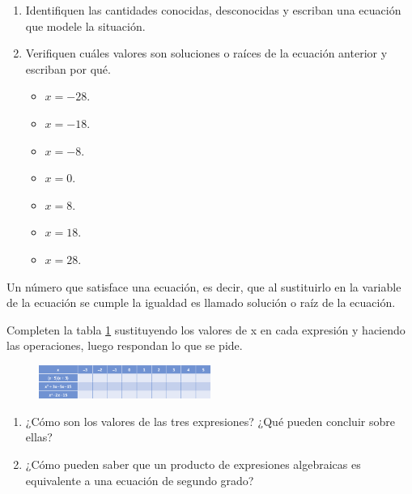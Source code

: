 \documentclass[11pt]{book}
\begin{document}
\begin{enumerate}
        \begin{enumerate}
          \item Identifiquen las cantidades conocidas, desconocidas y escriban una ecuación que
                modele la situación.
          \item Verifiquen cuáles valores son soluciones o raíces de la ecuación anterior y escriban
                por qué.
                \begin{itemize}
                  \item $x = -28$.
                  \item $x = -18$.
                  \item $x = -8$.
                  \item $x = 0$.
                  \item $x = 8$.
                  \item $x = 18$.
                  \item $x = 28$.
                \end{itemize}

        \end{enumerate}
\end{enumerate}
\begin{boxH}
  Un número que satisface una ecuación, es decir, que al sustituirlo en la variable de
  la ecuación se cumple la igualdad es llamado solución o raíz de la ecuación.
\end{boxH}

Completen la tabla \ref{tab:table01} sustituyendo los valores de x en cada expresión y haciendo las operaciones, luego respondan lo que se pide.

\begin{figure}[H]
  \centering
  \includegraphics[width=0.5\textwidth]{tabla01.png}
  \label{tab:table01}
\end{figure}

\begin{enumerate}
  \item ¿Cómo son los valores de las tres expresiones? ¿Qué pueden concluir sobre ellas?
  \item ¿Cómo pueden saber que un producto de expresiones algebraicas es equivalente a una ecuación de segundo grado?
\end{enumerate}
\end{document}
